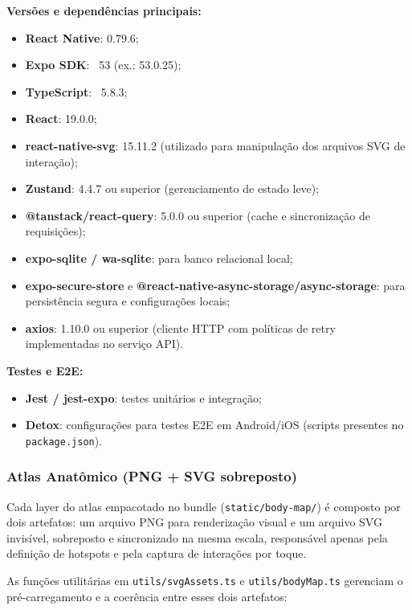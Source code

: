     \textbf{Versões e dependências principais:}
\begin{itemize}
    \item \textbf{React Native}: 0.79.6;
    \item \textbf{Expo SDK}: ~53 (ex.: 53.0.25);
    \item \textbf{TypeScript}: ~5.8.3;
    \item \textbf{React}: 19.0.0;
    \item \textbf{react-native-svg}: 15.11.2 (utilizado para manipulação dos arquivos SVG de interação);
    \item \textbf{Zustand}: 4.4.7 ou superior (gerenciamento de estado leve);
    \item \textbf{@tanstack/react-query}: 5.0.0 ou superior (cache e sincronização de requisições);
    \item \textbf{expo-sqlite / wa-sqlite}: para banco relacional local;
    \item \textbf{expo-secure-store} e \textbf{@react-native-async-storage/async-storage}: para persistência segura e configurações locais;
    \item \textbf{axios}: 1.10.0 ou superior (cliente HTTP com políticas de retry implementadas no serviço API).
\end{itemize}

    \textbf{Testes e E2E:}
\begin{itemize}
    \item \textbf{Jest / jest-expo}: testes unitários e integração;
    \item \textbf{Detox}: configurações para testes E2E em Android/iOS (scripts presentes no \texttt{package.json}).
\end{itemize}

\subsubsection{Atlas Anatômico (PNG + SVG sobreposto)}

Cada layer do atlas empacotado no bundle (\texttt{static/body-map/}) é composto por dois artefatos: um arquivo PNG para renderização visual e um arquivo SVG invisível, sobreposto e sincronizado na mesma escala, responsável apenas pela definição de hotspots e pela captura de interações por toque.

As funções utilitárias em \texttt{utils/svgAssets.ts} e \texttt{utils/bodyMap.ts} gerenciam o pré-carregamento e a coerência entre esses dois artefatos:


